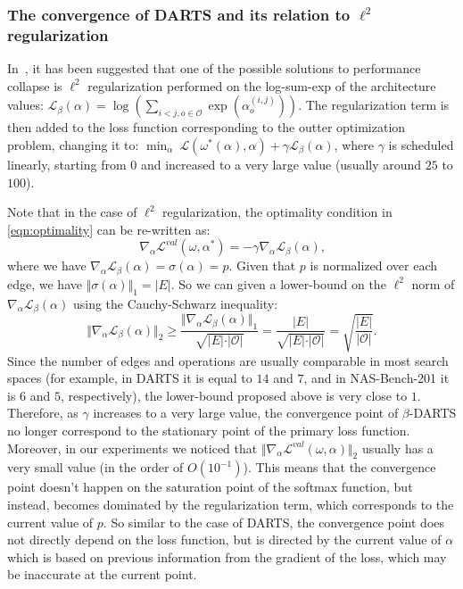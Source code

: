 \documentclass{article} \usepackage{fancyhdr, iclr2023_conference, times}
\begin{document}
\subsubsection{The convergence of DARTS and its relation to $\ell^2$ regularization}
\label{sec:l2-reg}
\par In~\citep{DBLP:journals/corr/abs-2203-01665}, it has been suggested that one of the possible solutions to performance collapse is $\ell^2$ regularization performed on the log-sum-exp of the architecture values: $\mathcal{L}_\beta(\alpha) = \log(\sum_{i<j, o\in \mathcal{O}} \exp(\alpha_o^{(i, j)}))$. The regularization term is then added to the loss function corresponding to the outter optimization problem, changing it to: $\min_\alpha~\mathcal{L}(\omega^*(\alpha), \alpha)+\gamma \mathcal{L}_\beta(\alpha)$, where $\gamma$ is scheduled linearly, starting from $0$ and increased to a very large value (usually around $25$ to $100$). 
\par Note that in the case of $\ell^2$ regularization, the optimality condition in \ref{eqn:optimality} can be re-written as:
\begin{equation}
    \nabla_\alpha \mathcal{L}^{val}(\omega, \alpha^*)=-\gamma \nabla_\alpha \mathcal{L}_\beta(\alpha) \text{,}
\end{equation}
where we have $\nabla_\alpha \mathcal{L}_\beta(\alpha)=\sigma(\alpha)=p$. Given that $p$ is normalized over each edge, we have $\Vert \sigma(\alpha)\Vert_1=\vert E\vert$. So we can given a lower-bound on the $\ell^2$ norm of $\nabla_\alpha \mathcal{L}_\beta(\alpha)$ using the Cauchy-Schwarz inequality:
\begin{equation}
    \Vert \nabla_\alpha \mathcal{L}_\beta(\alpha)\Vert_2\geq \frac{\Vert \nabla_\alpha \mathcal{L}_\beta(\alpha)\Vert_1}{\sqrt{\vert E\vert \cdot \vert \mathcal{O}\vert}}=\frac{\vert E\vert}{\sqrt{\vert E\vert\cdot\vert\mathcal{O}\vert}}=\sqrt{\frac{\vert E\vert}{\vert\mathcal{O}\vert}}\text{.}
\end{equation}
Since the number of edges and operations are usually comparable in most search spaces (for example, in DARTS it is equal to $14$ and $7$, and in NAS-Bench-201 it is $6$ and $5$, respectively), the lower-bound proposed above is very close to $1$. Therefore, as $\gamma$ increases to a very large value, the convergence point of $\beta$-DARTS no longer correspond to the stationary point of the primary loss function. Moreover, in our experiments we noticed that $\Vert\nabla_\alpha \mathcal{L}^{val}(\omega, \alpha)\Vert_2$ usually has a very small value (in the order of $O(10^{-1})$). This means that the convergence point doesn't happen on the saturation point of the softmax function, but instead, becomes dominated by the regularization term, which corresponds to the current value of $p$. So similar to the case of DARTS, the convergence point does not directly depend on the loss function, but is directed by the current value of $\alpha$ which is based on previous information from the gradient of the loss, which may be inaccurate at the current point.
\end{document}
